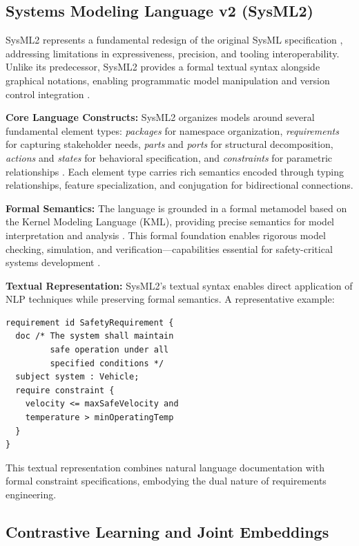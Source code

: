 \documentclass{article}
\begin{document}
\subsection{Systems Modeling Language v2 (SysML2)}

SysML2 represents a fundamental redesign of the original SysML specification \cite{sysml2spec, hause2021sysml}, addressing limitations in expressiveness, precision, and tooling interoperability. Unlike its predecessor, SysML2 provides a formal textual syntax alongside graphical notations, enabling programmatic model manipulation and version control integration \cite{delligatti2024systems}.

\textbf{Core Language Constructs:} SysML2 organizes models around several fundamental element types: \textit{packages} for namespace organization, \textit{requirements} for capturing stakeholder needs, \textit{parts} and \textit{ports} for structural decomposition, \textit{actions} and \textit{states} for behavioral specification, and \textit{constraints} for parametric relationships \cite{friedenthal2014practical}. Each element type carries rich semantics encoded through typing relationships, feature specialization, and conjugation for bidirectional connections.

\textbf{Formal Semantics:} The language is grounded in a formal metamodel based on the Kernel Modeling Language (KML), providing precise semantics for model interpretation and analysis \cite{sysml2spec}. This formal foundation enables rigorous model checking, simulation, and verification—capabilities essential for safety-critical systems development \cite{estefan2008survey}.

\textbf{Textual Representation:} SysML2's textual syntax enables direct application of NLP techniques while preserving formal semantics. A representative example:

\begin{verbatim}
requirement id SafetyRequirement {
  doc /* The system shall maintain
         safe operation under all
         specified conditions */
  subject system : Vehicle;
  require constraint {
    velocity <= maxSafeVelocity and
    temperature > minOperatingTemp
  }
}
\end{verbatim}

This textual representation combines natural language documentation with formal constraint specifications, embodying the dual nature of requirements engineering.

\subsection{Contrastive Learning and Joint Embeddings}
\end{document}
